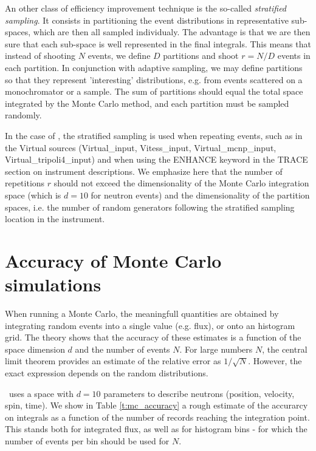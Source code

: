 An other class of efficiency improvement technique is the so-called \emph{stratified sampling}. It consists in partitioning the event distributions in representative sub-spaces, which are then all sampled individualy. The advantage is that we are then sure that each sub-space is well represented in the final integrals. This means that instead of shooting $N$ events, we define $D$ partitions and shoot $r=N/D$ events in each partition. In conjunction with adaptive sampling, we may define partitions so that they represent 'interesting' distributions, e.g. from events scattered on a monochromator or a sample. The sum of partitions should equal the total space integrated by the Monte Carlo method, and each partition must be sampled randomly.

In the case of \MCS, the stratified sampling is used when repeating events, such as in the Virtual sources (Virtual\_input, Vitess\_input, Virtual\_mcnp\_input, Virtual\_tripoli4\_input) and when using the ENHANCE keyword in the TRACE section on instrument descriptions. We emphasize here that the number of repetitions $r$ should not exceed the dimensionality of the Monte Carlo integration space (which is $d=10$ for neutron events) and the dimensionality of the partition spaces, i.e. the number of random generators following the stratified sampling location in the instrument.

\section{Accuracy of Monte Carlo simulations}

When running a Monte Carlo, the meaningfull quantities are obtained by integrating random events into a single value (e.g. flux), or onto an histogram grid. The theory \cite{James80} shows that the accuracy of these estimates is a function of the space dimension $d$ and the number of events $N$. For large numbers $N$, the central limit theorem provides an estimate of the relative error as $1/\sqrt{N}$. However, the exact expression depends on the random distributions.

\MCS\ uses a space with $d=10$ parameters to describe neutrons (position, velocity, spin, time). We show in Table \ref{t:mc_accuracy} a rough estimate of the accurarcy on integrals as a function of the number of records reaching the integration point. This stands both for integrated flux, as well as for histogram bins - for which the number of events per bin should be used for $N$.

